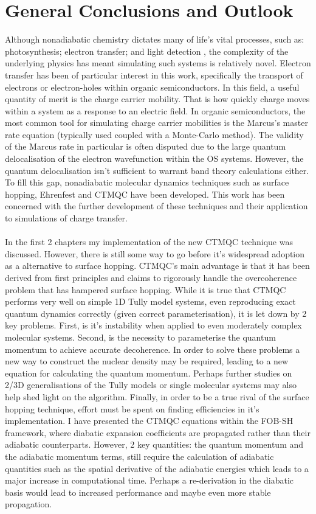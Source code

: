 \chapter{General Conclusions and Outlook}
\label{chap:outlook}
Although nonadiabatic chemistry dictates many of life's vital processes, such as: photosynthesis; electron transfer; and light detection \cite{Dral2018}, the complexity of the underlying physics has meant simulating such systems is relatively novel. Electron transfer has been of particular interest in this work, specifically the transport of electrons or electron-holes within organic semiconductors. In this field, a useful quantity of merit is the charge carrier mobility. That is how quickly charge moves within a system as a response to an electric field. In organic semiconductors, the most common tool for simulating charge carrier mobilities is the Marcus's master rate equation (typically used coupled with a Monte-Carlo method). The validity of the Marcus rate in particular is often disputed due to the large quantum delocalisation of the electron wavefunction within the OS systems. However, the quantum delocalisation isn't sufficient to warrant band theory calculations either. To fill this gap, nonadiabatic molecular dynamics techniques such as surface hopping, Ehrenfest and CTMQC have been developed. This work has been concerned with the further development of these techniques and their application to simulations of charge transfer.
\\\\
In the first 2 chapters my implementation of the new CTMQC technique was discussed. However, there is still some way to go before it's widespread adoption as a alternative to surface hopping. CTMQC's main advantage is that it has been derived from first principles and claims to rigorously handle the overcoherence problem that has hampered surface hopping. While it is true that CTMQC performs very well on simple 1D Tully model systems, even reproducing exact quantum dynamics correctly (given correct parameterisation), it is let down by 2 key problems. First, is it's instability when applied to even moderately complex molecular systems. Second, is the necessity to parameterise the quantum momentum to achieve accurate decoherence. In order to solve these problems a new way to construct the nuclear density may be required, leading to a new equation for calculating the quantum momentum. Perhaps further studies on 2/3D generalisations of the Tully models or single molecular systems may also help shed light on the algorithm. Finally, in order to be a true rival of the surface hopping technique, effort must be spent on finding efficiencies in it's implementation. I have presented the CTMQC equations within the FOB-SH framework, where diabatic expansion coefficients are propagated rather than their adiabatic counterparts. However, 2 key quantities: the quantum momentum and the adiabatic momentum terms, still require the calculation of adiabatic quantities such as the spatial derivative of the adiabatic energies which leads to a major increase in computational time. Perhaps a re-derivation in the diabatic basis would lead to increased performance and maybe even more stable propagation.

